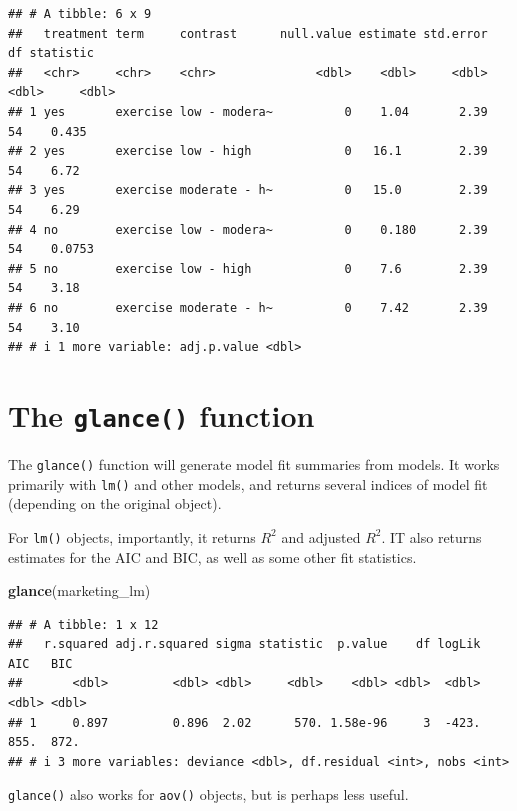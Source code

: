 \documentclass[
]{book}
\newenvironment{Shaded}{\begin{snugshade}}{\end{snugshade}}
\newcommand{\FunctionTok}[1]{\textcolor[rgb]{0.13,0.29,0.53}{\textbf{#1}}}
\newcommand{\NormalTok}[1]{#1}
\begin{document}
\begin{verbatim}
## # A tibble: 6 x 9
##   treatment term     contrast      null.value estimate std.error    df statistic
##   <chr>     <chr>    <chr>              <dbl>    <dbl>     <dbl> <dbl>     <dbl>
## 1 yes       exercise low - modera~          0    1.04       2.39    54    0.435 
## 2 yes       exercise low - high             0   16.1        2.39    54    6.72  
## 3 yes       exercise moderate - h~          0   15.0        2.39    54    6.29  
## 4 no        exercise low - modera~          0    0.180      2.39    54    0.0753
## 5 no        exercise low - high             0    7.6        2.39    54    3.18  
## 6 no        exercise moderate - h~          0    7.42       2.39    54    3.10  
## # i 1 more variable: adj.p.value <dbl>
\end{verbatim}

\hypertarget{broom-glance}{%
\section{\texorpdfstring{The \texttt{glance()} function}{The glance() function}}\label{broom-glance}}

The \texttt{glance()} function will generate model fit summaries from models. It works primarily with \texttt{lm()} and other models, and returns several indices of model fit (depending on the original object).

For \texttt{lm()} objects, importantly, it returns \(R^2\) and adjusted \(R^2\). IT also returns estimates for the AIC and BIC, as well as some other fit statistics.

\begin{Shaded}
\begin{Highlighting}[]
\FunctionTok{glance}\NormalTok{(marketing\_lm)}
\end{Highlighting}
\end{Shaded}

\begin{verbatim}
## # A tibble: 1 x 12
##   r.squared adj.r.squared sigma statistic  p.value    df logLik   AIC   BIC
##       <dbl>         <dbl> <dbl>     <dbl>    <dbl> <dbl>  <dbl> <dbl> <dbl>
## 1     0.897         0.896  2.02      570. 1.58e-96     3  -423.  855.  872.
## # i 3 more variables: deviance <dbl>, df.residual <int>, nobs <int>
\end{verbatim}

\texttt{glance()} also works for \texttt{aov()} objects, but is perhaps less useful.
\end{document}
